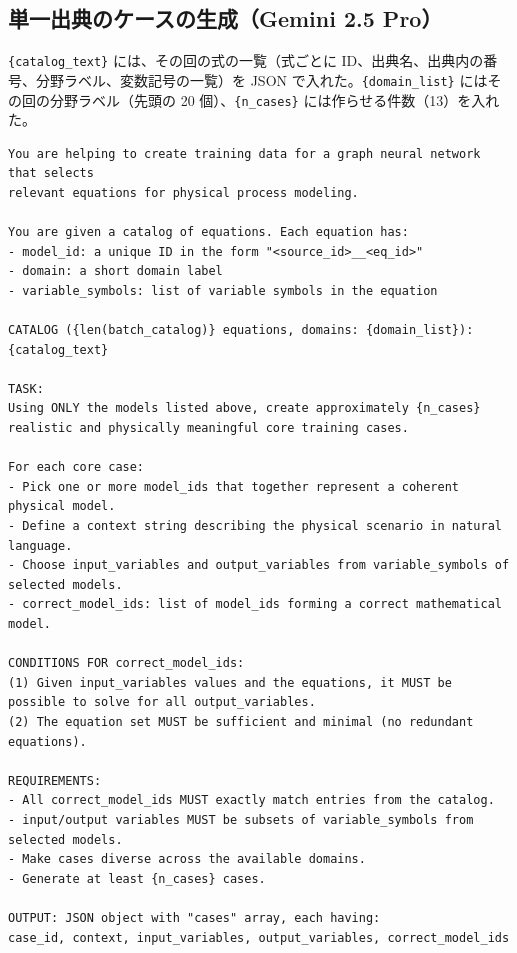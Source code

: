 \documentclass[11pt,a4paper]{ltjsarticle}
\begin{document}
\subsection{単一出典のケースの生成（Gemini 2.5 Pro）}
\texttt{\{catalog\_text\}} には、その回の式の一覧（式ごとに ID、出典名、出典内の番号、分野ラベル、変数記号の一覧）を JSON で入れた。\texttt{\{domain\_list\}} にはその回の分野ラベル（先頭の 20 個）、\texttt{\{n\_cases\}} には作らせる件数（13）を入れた。
\begin{Verbatim}[fontsize=\scriptsize, breaklines=true, frame=single]
You are helping to create training data for a graph neural network that selects
relevant equations for physical process modeling.

You are given a catalog of equations. Each equation has:
- model_id: a unique ID in the form "<source_id>__<eq_id>"
- domain: a short domain label
- variable_symbols: list of variable symbols in the equation

CATALOG ({len(batch_catalog)} equations, domains: {domain_list}):
{catalog_text}

TASK:
Using ONLY the models listed above, create approximately {n_cases}
realistic and physically meaningful core training cases.

For each core case:
- Pick one or more model_ids that together represent a coherent physical model.
- Define a context string describing the physical scenario in natural language.
- Choose input_variables and output_variables from variable_symbols of selected models.
- correct_model_ids: list of model_ids forming a correct mathematical model.

CONDITIONS FOR correct_model_ids:
(1) Given input_variables values and the equations, it MUST be possible to solve for all output_variables.
(2) The equation set MUST be sufficient and minimal (no redundant equations).

REQUIREMENTS:
- All correct_model_ids MUST exactly match entries from the catalog.
- input/output variables MUST be subsets of variable_symbols from selected models.
- Make cases diverse across the available domains.
- Generate at least {n_cases} cases.

OUTPUT: JSON object with "cases" array, each having:
case_id, context, input_variables, output_variables, correct_model_ids
\end{Verbatim}
\end{document}
